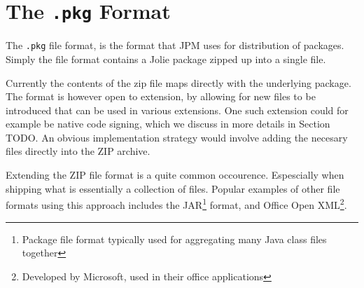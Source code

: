 \section{The {\tt .pkg} Format} \label{sec:pkg}

The \verb!.pkg! file format, is the format that JPM uses for distribution of
packages. Simply the file format contains a Jolie package zipped up into a
single file.

Currently the contents of the zip file maps directly with the underlying
package. The format is however open to extension, by allowing for new files to
be introduced that can be used in various extensions. One such extension could
for example be native code signing, which we discuss in more details in Section
TODO. An obvious implementation strategy would involve adding the necesary
files directly into the ZIP archive.

Extending the ZIP file format is a quite common occourence. Espescially when
shipping what is essentially a collection of files. Popular examples of other
file formats using this approach includes the JAR\footnote{Package file format
    typically used for aggregating many Java class files together} format, and
    Office Open XML\footnote{Developed by Microsoft, used in their office
        applications}.

